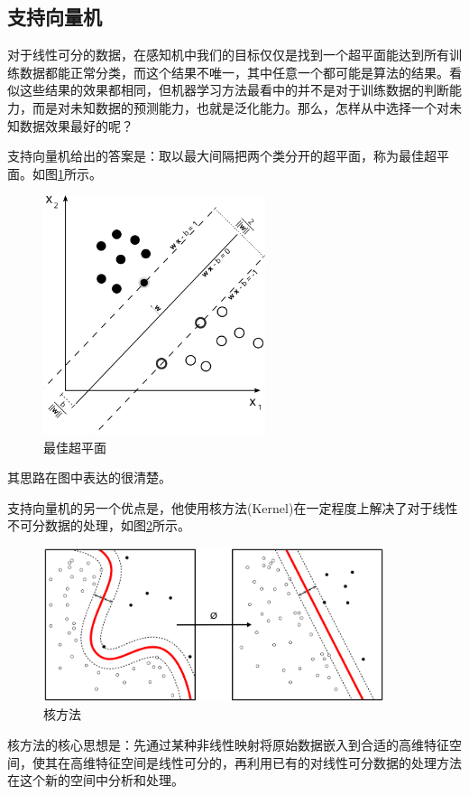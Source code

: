 \documentclass[a4paper,8pt]{article}
\begin{document}
\subsection{支持向量机}

对于线性可分的数据，在感知机中我们的目标仅仅是找到一个超平面能达到所有训练数据都能正常分类，而这个结果不唯一，其中任意一个都可能是算法的结果。看似这些结果的效果都相同，但机器学习方法最看中的并不是对于训练数据的判断能力，而是对未知数据的预测能力，也就是泛化能力。那么，怎样从中选择一个对未知数据效果最好的呢？

支持向量机给出的答案是：取以最大间隔把两个类分开的超平面，称为最佳超平面。如图\ref{fig:max margin}所示。

\begin{figure}[htbp]
\centering
\includegraphics[width=6.5cm]{./fig/max_margin.png}
\caption{最佳超平面}\label{fig:max margin}
\end{figure}

其思路在图中表达的很清楚。

支持向量机的另一个优点是，他使用核方法(Kernel)在一定程度上解决了对于线性不可分数据的处理，如图\ref{fig:kernel}所示。

\begin{figure}[htbp]
\centering
\includegraphics[width=10cm]{./fig/Kernel.png}
\caption{核方法}\label{fig:kernel}
\end{figure}

核方法的核心思想是：先通过某种非线性映射将原始数据嵌入到合适的高维特征空间，使其在高维特征空间是线性可分的，再利用已有的对线性可分数据的处理方法
在这个新的空间中分析和处理。
\end{document}
